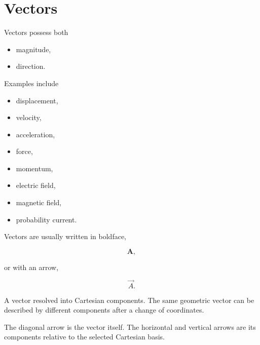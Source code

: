 \section{Vectors}

Vectors possess both

\begin{itemize}
	\item magnitude,
	\item direction.
\end{itemize}

Examples include

\begin{itemize}
	\item displacement,
	\item velocity,
	\item acceleration,
	\item force,
	\item momentum,
	\item electric field,
	\item magnetic field,
	\item probability current.
\end{itemize}

Vectors are usually written in boldface,

\[
\mathbf A,
\]

or with an arrow,

\[
\vec A.
\]



\begin{bookfigure}{A vector resolved into Cartesian components. The same
geometric vector can be described by different components after a change of
coordinates.}
\end{bookfigure}

\begin{visualguidebox}
The diagonal arrow is the vector itself. The horizontal and vertical arrows are
its components relative to the selected Cartesian basis.
\end{visualguidebox}
